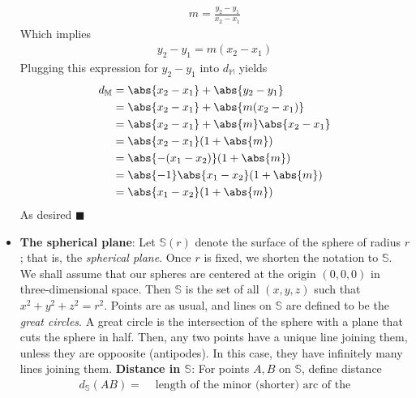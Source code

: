 \documentclass{report}
\begin{document}
\begin{itemize}
            \begin{align*}
                m = \frac{y_{2}-y_{1}}{x_{2} - x_{1}}
            \end{align*}
            Which implies 
            \begin{align*}
                y_{2} - y_{1} = m(x_{2} - x_{1})
            \end{align*}
            Plugging this expression for $y_{2} -y_{1}$ into $d_{\mathbb{M}}$ yields
            \begin{align*}
                d_{\mathbb{M}} &= \abs{x_{2} - x_{1}} + \abs{y_{2} - y_{1}} \\
                               &= \abs{x_{2} - x_{1}} + \abs{m(x_{2} - x_{1})} \\
                               &= \abs{x_{2} - x_{1}} + \abs{m}\abs{x_{2} - x_{1}} \\
                               &= \abs{x_{2} - x_{1}}(1 + \abs{m}) \\
                               &= \abs{-(x_{1} - x_{2})} (1 + \abs{m}) \\
                               &= \abs{-1}\abs{x_{1} - x_{2}} (1 + \abs{m}) \\
                               &= \abs{x_{1} - x_{2}} (1 + \abs{m}) \\
            \end{align*}
            As desired \hspace*{\fill} $\blacksquare$
        \item \textbf{The spherical plane}: Let $\mathbb{S}(r)$ denote the surface of the sphere of radius $r$; that is, the \textit{spherical plane}.
            \bigbreak \noindent 
            Once $r$ is fixed, we shorten the notation to $\mathbb{S}$. We shall assume that our spheres are centered at the origin $(0,0,0)$ in three-dimensional space. Then $\mathbb{S}$ is the set of all $(x,y,z)$ such that $x^{2} + y^{2} + z^{2} = r^{2} $. Points are as usual, and lines on $\mathbb{S}$ are defined to be the \textit{great circles}. A great circle is the intersection of the sphere with a plane that cuts the sphere in half. Then, any two points have a unique line joining them, unless they are oppoosite (antipodes). In this case, they have infinitely many lines joining them.
            \bigbreak \noindent 
            \textbf{Distance in $\mathbb{S}$}: For points $A,B$ on $\mathbb{S}$, define distance
            \begin{align*}
                d_{\mathbb{S}}(AB) = &\text{ length of the minor (shorter) arc of the} \\

\end{align*}
\end{itemize}
\end{document}
